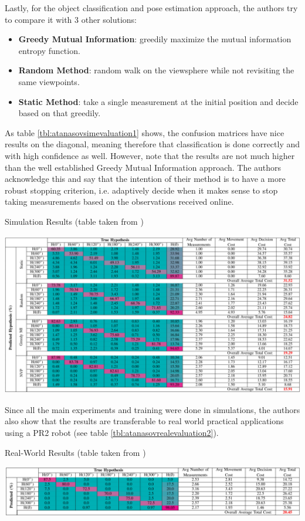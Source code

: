 \documentclass[12pt,twoside]{article}
\theoremstyle{plain}
\theoremstyle{definition}
\theoremstyle{remark}
\begin{document}
Lastly, for the object classification and pose estimation approach, the authors try to compare it with 3 other solutions:
\begin{itemize}
\item \textbf{Greedy Mutual Information}: greedily maximize the mutual information entropy function.
\item \textbf{Random Method}: random walk on the viewsphere while not revisiting the same viewpoints.
\item \textbf{Static Method}: take a single measurement at the initial position and decide based on that greedily. 
\end{itemize}

As table \ref{tbl:atanasovsimevaluation1} shows, the confusion matrices have nice results on the diagonal, meaning therefore that classification is done correctly and with high confidence as well. However, note that the results are not much higher than the well established Greedy Mutual Information approach. The authors acknowledge this and say that the intention of their method is to have a more robust stopping criterion, i.e. adaptively decide when it makes sense to stop taking measurements based on the observations received online. 

\begin{table}[H]
  \caption{Simulation Results (table taken from \cite{atanasov2014nonmyopic})}
  \label{tbl:atanasovsimevaluation1}
  \includegraphics[width=\linewidth]{atanasovevaluation1.png}
\end{table}

Since all the main experiments and training were done in simulations, the authors also show that the results are transferable to real world practical applications using a PR2 robot (see table \ref{tbl:atanasovrealevaluation2}). 

\begin{table}[H]
  \caption{Real-World Results (table taken from \cite{atanasov2014nonmyopic})}
  \label{tbl:atanasovrealevaluation2}
  \includegraphics[width=\linewidth]{atanasovevaluation2.png}
\end{table}
\end{document}
